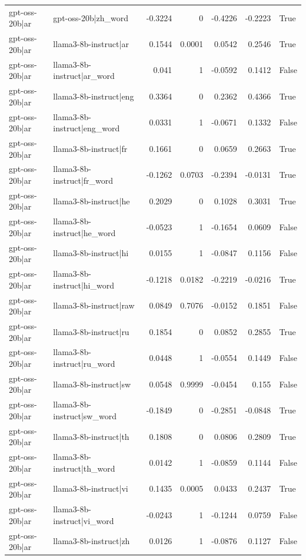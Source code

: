 \begin{table}
\begin{tabular}{l l r r r r l}
gpt-oss-20b|ar & gpt-oss-20b|zh_word & -0.3224 & 0 & -0.4226 & -0.2223 & True \\
gpt-oss-20b|ar & llama3-8b-instruct|ar & 0.1544 & 0.0001 & 0.0542 & 0.2546 & True \\
gpt-oss-20b|ar & llama3-8b-instruct|ar_word & 0.041 & 1 & -0.0592 & 0.1412 & False \\
gpt-oss-20b|ar & llama3-8b-instruct|eng & 0.3364 & 0 & 0.2362 & 0.4366 & True \\
gpt-oss-20b|ar & llama3-8b-instruct|eng_word & 0.0331 & 1 & -0.0671 & 0.1332 & False \\
gpt-oss-20b|ar & llama3-8b-instruct|fr & 0.1661 & 0 & 0.0659 & 0.2663 & True \\
gpt-oss-20b|ar & llama3-8b-instruct|fr_word & -0.1262 & 0.0703 & -0.2394 & -0.0131 & True \\
gpt-oss-20b|ar & llama3-8b-instruct|he & 0.2029 & 0 & 0.1028 & 0.3031 & True \\
gpt-oss-20b|ar & llama3-8b-instruct|he_word & -0.0523 & 1 & -0.1654 & 0.0609 & False \\
gpt-oss-20b|ar & llama3-8b-instruct|hi & 0.0155 & 1 & -0.0847 & 0.1156 & False \\
gpt-oss-20b|ar & llama3-8b-instruct|hi_word & -0.1218 & 0.0182 & -0.2219 & -0.0216 & True \\
gpt-oss-20b|ar & llama3-8b-instruct|raw & 0.0849 & 0.7076 & -0.0152 & 0.1851 & False \\
gpt-oss-20b|ar & llama3-8b-instruct|ru & 0.1854 & 0 & 0.0852 & 0.2855 & True \\
gpt-oss-20b|ar & llama3-8b-instruct|ru_word & 0.0448 & 1 & -0.0554 & 0.1449 & False \\
gpt-oss-20b|ar & llama3-8b-instruct|sw & 0.0548 & 0.9999 & -0.0454 & 0.155 & False \\
gpt-oss-20b|ar & llama3-8b-instruct|sw_word & -0.1849 & 0 & -0.2851 & -0.0848 & True \\
gpt-oss-20b|ar & llama3-8b-instruct|th & 0.1808 & 0 & 0.0806 & 0.2809 & True \\
gpt-oss-20b|ar & llama3-8b-instruct|th_word & 0.0142 & 1 & -0.0859 & 0.1144 & False \\
gpt-oss-20b|ar & llama3-8b-instruct|vi & 0.1435 & 0.0005 & 0.0433 & 0.2437 & True \\
gpt-oss-20b|ar & llama3-8b-instruct|vi_word & -0.0243 & 1 & -0.1244 & 0.0759 & False \\
gpt-oss-20b|ar & llama3-8b-instruct|zh & 0.0126 & 1 & -0.0876 & 0.1127 & False \\

\end{tabular}
\end{table}
